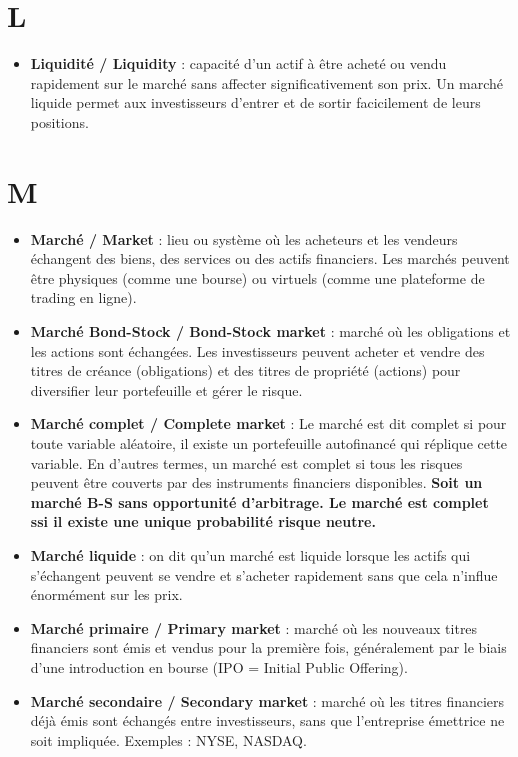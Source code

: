 \documentclass[a4paper,10pt]{article}
\begin{document}
\begin{multicols}{2}
\section*{L}
\begin{itemize}
  \item \textbf{Liquidité / Liquidity} : capacité d'un actif à être acheté ou vendu rapidement sur le marché sans affecter significativement son prix. Un marché liquide permet aux investisseurs d'entrer et de sortir facicilement de leurs positions.
\end{itemize}

\section*{M}
\begin{itemize}
  \item \textbf{Marché / Market} : lieu ou système où les acheteurs et les vendeurs échangent des biens, des services ou des actifs financiers. Les marchés peuvent être physiques (comme une bourse) ou virtuels (comme une plateforme de trading en ligne).
  \item \textbf{Marché Bond-Stock / Bond-Stock market} : marché où les obligations et les actions sont échangées. Les investisseurs peuvent acheter et vendre des titres de créance (obligations) et des titres de propriété (actions) pour diversifier leur portefeuille et gérer le risque.
  \item \textbf{Marché complet / Complete market} : Le marché est dit complet si pour toute variable aléatoire, il existe un portefeuille autofinancé qui réplique cette variable. En d’autres termes, un marché est complet si tous les risques peuvent être couverts par des instruments financiers disponibles. \textbf{Soit un marché B-S sans opportunité d'arbitrage. Le marché est complet ssi il existe une unique probabilité risque neutre.}
  \item \textbf{Marché liquide} : on dit qu'un marché est liquide lorsque les actifs qui s'échangent peuvent se vendre et s'acheter rapidement sans que cela n'influe énormément sur les prix.
  \item \textbf{Marché primaire / Primary market} : marché où les nouveaux titres financiers sont émis et vendus pour la première fois, généralement par le biais d’une introduction en bourse (IPO = Initial Public Offering).
  \item \textbf{Marché secondaire / Secondary market} : marché où les titres financiers déjà émis sont échangés entre investisseurs, sans que l’entreprise émettrice ne soit impliquée. Exemples : NYSE, NASDAQ.

\end{itemize}
\end{multicols}
\end{document}
